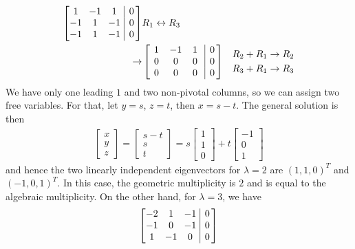 \begin{solution}
\begin{align*}
\left[\begin{array}{@{\,}wc{10pt}wc{10pt}wc{10pt}|c@{\,}}
1 & -1 & 1 & 0 \\
-1 & 1 & -1 & 0 \\
-1 & 1 & -1 & 0 
\end{array}\right] & R_1 \leftrightarrow R_3 \\
\to&
\left[\begin{array}{@{\,}wc{10pt}wc{10pt}wc{10pt}|c@{\,}}
1 & -1 & 1 & 0 \\
0 & 0 & 0 & 0 \\
0 & 0 & 0 & 0
\end{array}\right] & \begin{aligned}
R_2 + R_1 &\to R_2 \\
R_3 + R_1 &\to R_3 \\
\end{aligned}
\end{align*}
We have only one leading $1$ and two non-pivotal columns, so we can assign two free variables. For that, let $y = s$, $z = t$, then $x = s - t$. The general solution is then
\begin{align*}
\begin{bmatrix}
x \\
y \\ 
z
\end{bmatrix}
=
\begin{bmatrix}
s - t \\
s \\ 
t
\end{bmatrix}
=
s
\begin{bmatrix}
1 \\
1 \\
0
\end{bmatrix}
+ t 
\begin{bmatrix}
-1 \\
0 \\
1
\end{bmatrix}
\end{align*}
and hence the two linearly independent eigenvectors for $\lambda = 2$ are $(1,1,0)^T$ and $(-1,0,1)^T$. In this case, the geometric multiplicity is $2$ and is equal to the algebraic multiplicity. On the other hand, for $\lambda = 3$, we have
\begin{align*}
\left[\begin{array}{@{\,}wc{10pt}wc{10pt}wc{10pt}|c@{\,}}
-2 & 1 & -1 & 0 \\
-1 & 0 & -1 & 0 \\
1 & -1 & 0 & 0
\end{array}\right] 

\end{align*}
\end{solution}
